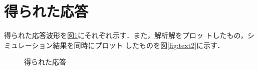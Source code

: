 \documentclass[a4paper,12pt]{jarticle}
\begin{document}
\section{得られた応答}
%
得られた応答波形を図\ref{fig:output}にそれぞれ示す．また，解析解をプロッ
トしたもの，シミュレーション結果を同時にプロット
したものを図\ref{fig:text2}に示す．
%
\begin{figure}[htbp]
  \begin{center} 
  \hfill
  \end{center}
  \caption{得られた応答}
  \label{fig:output}
\end{figure}
\end{document}
